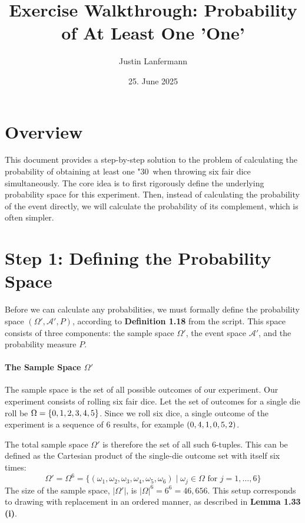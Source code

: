 \documentclass[11pt,a4paper]{article}
\title{\textbf{Exercise Walkthrough: Probability of At Least One 'One'}}
\author{Justin Lanfermann}
\date{25. June 2025}
\providecommand{\dicei}{\wasyfamily\char"30}
\providecommand{\diceii}{\wasyfamily\char"31}
\providecommand{\diceiii}{\wasyfamily\char"32}
\providecommand{\diceiv}{\wasyfamily\char"33}
\providecommand{\dicev}{\wasyfamily\char"34}
\providecommand{\dicevi}{\wasyfamily\char"35}
\begin{document}
\maketitle

\section{Overview}
This document provides a step-by-step solution to the problem of calculating the probability of obtaining at least one \dicei\ when throwing six fair dice simultaneously. The core idea is to first rigorously define the underlying probability space for this experiment. Then, instead of calculating the probability of the event directly, we will calculate the probability of its complement, which is often simpler.

\section{Step 1: Defining the Probability Space}

Before we can calculate any probabilities, we must formally define the probability space $(\Omega', \mathcal{A}', P)$, according to \textbf{Definition 1.18} from the script. This space consists of three components: the sample space $\Omega'$, the event space $\mathcal{A}'$, and the probability measure $P$.

\paragraph{The Sample Space $\Omega'$}
The sample space is the set of all possible outcomes of our experiment. Our experiment consists of rolling six fair dice. Let the set of outcomes for a single die roll be $\Omega = \{\dicei, \diceii, \diceiii, \diceiv, \dicev, \dicevi\}$.
Since we roll six dice, a single outcome of the experiment is a sequence of 6 results, for example $(\dicei, \dicev, \diceii, \dicei, \dicevi, \diceiii)$.

The total sample space $\Omega'$ is therefore the set of all such 6-tuples. This can be defined as the Cartesian product of the single-die outcome set with itself six times:
\[
\Omega' = \Omega^6 = \{ (\omega_1, \omega_2, \omega_3, \omega_4, \omega_5, \omega_6) \mid \omega_j \in \Omega \text{ for } j=1,\dots,6 \}
\]
The size of the sample space, $|\Omega'|$, is $|\Omega|^6 = 6^6 = 46,656$. This setup corresponds to drawing with replacement in an ordered manner, as described in \textbf{Lemma 1.33 (i)}.
\end{document}
